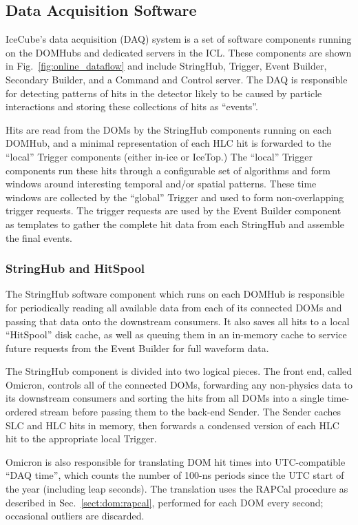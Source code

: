 \subsection{Data Acquisition Software}

IceCube's data acquisition (DAQ) system is a set of software components
running on the DOMHubs and dedicated servers in the ICL.  These components are shown in
Fig.~\ref{fig:online_dataflow} and include StringHub, Trigger, Event
Builder, Secondary Builder, and a Command and Control server.  The DAQ is
responsible for detecting patterns of hits in the detector likely to be
caused by particle interactions and storing these collections of hits as
``events''.

Hits are read from the DOMs by the
StringHub components running on each DOMHub, and a minimal representation of each HLC hit is
forwarded to the ``local'' Trigger components (either in-ice or IceTop.)
The ``local'' Trigger components run these hits through a
configurable set of algorithms and form windows around interesting temporal
and/or spatial patterns.  These time windows are collected by the
``global'' Trigger and used to form non-overlapping trigger requests.
The trigger requests are used by the Event Builder component as templates
to gather the complete hit data from each StringHub and assemble the final
events.

\subsubsection{StringHub and HitSpool}
\label{sec:domhub_hitspool}

The StringHub software component which runs on each DOMHub is responsible
for periodically reading all available data from each of its connected DOMs
and passing that data onto the downstream consumers.  It also saves all
hits to a local ``HitSpool'' disk cache, as well as queuing them in an
in-memory cache to service future requests from the Event Builder for full
waveform data.

The StringHub component is divided into two logical pieces.  The front end,
called Omicron, controls all of the connected DOMs, forwarding any
non-physics data to its downstream consumers and sorting the hits from all
DOMs into a single time-ordered stream before passing them to the back-end
Sender.  The Sender caches SLC and HLC hits in memory, then forwards a
condensed version of each HLC hit to the appropriate local Trigger.

Omicron is also responsible for translating DOM hit times into
UTC-compatible ``DAQ time'', which counts the number of 100-ns periods
since the UTC start of the year (including leap seconds).  The translation
uses the RAPCal procedure as described in Sec.~\ref{sect:dom:rapcal},
performed for each DOM every second; occasional outliers are discarded.

